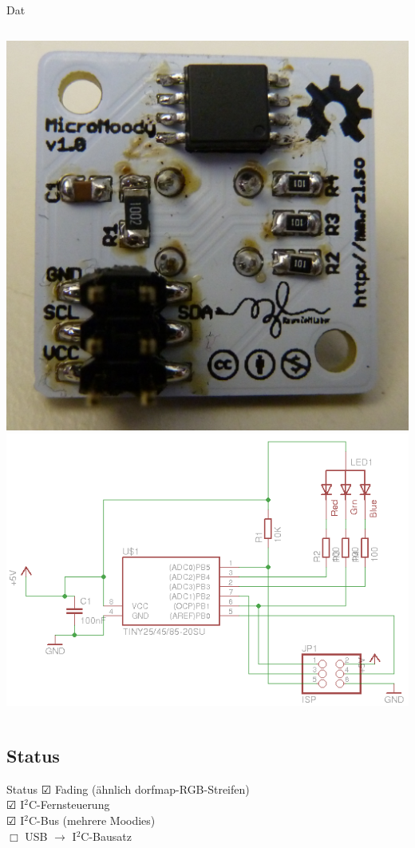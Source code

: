 \documentclass[compress]{beamer}
\begin{document}
\begin{frame}{Dat}
\begin{columns}
\includegraphics[width=\textwidth]{micromoody_back.jpg}
\includegraphics[width=\textwidth]{circuit.png}
\end{columns}
\end{frame}

\subsection{Status}
\begin{frame}{Status}
$\CheckedBox$ Fading (ähnlich dorfmap-RGB-Streifen)\\\pause
$\CheckedBox$ I$^2$C-Fernsteuerung\\\pause
$\CheckedBox$ I$^2$C-Bus (mehrere Moodies)\\\pause
$\Box$ USB $\to$ I$^2$C-Bausatz
\end{frame}
\end{document}

